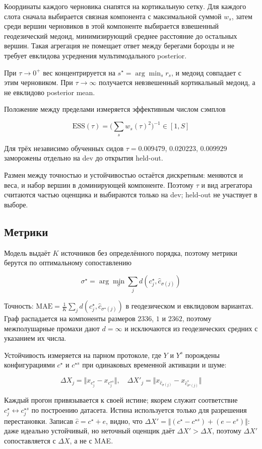 Координаты каждого черновика снапятся на кортикальную сетку. Для каждого слота сначала выбирается связная компонента с максимальной суммой $w_s$, затем среди вершин черновиков в этой компоненте выбирается взвешенный геодезический медоид, минимизирующий среднее расстояние до остальных вершин. Такая агрегация не помещает ответ между берегами борозды и не требует евклидова усреднения мультимодального posterior.

При $\tau \to 0^{+}$ вес концентрируется на $s^\star=\arg\min_s r_s$, и медоид совпадает с этим черновиком. При $\tau\to\infty$ получается невзвешенный кортикальный медоид, а не евклидово posterior mean.

Положение между пределами измеряется эффективным числом сэмплов

$$\mathrm{ESS}(\tau)=\Big(\sum_s w_s(\tau)^2\Big)^{-1} \in [1,S]$$

Для трёх независимо обученных сидов $\tau=0.009479$, $0.020223$, $0.009929$ заморожены отдельно на dev до открытия held-out.

Размен между точностью и устойчивостью остаётся дискретным: меняются и веса, и набор вершин в доминирующей компоненте. Поэтому $\tau$ и вид агрегатора считаются частью оценщика и выбираются только на dev; held-out не участвует в выборе.

\subsection{Метрики}

Модель выдаёт $K$ источников без определённого порядка, поэтому метрики берутся по оптимальному сопоставлению

$$\sigma^\star=\arg\min_{\sigma}\sum_{j} d(c^\star_j,\hat c_{\sigma(j)})$$

Точность: $\mathrm{MAE}=\frac1K\sum_j d(c^\star_j,\hat c_{\sigma^\star(j)})$ в геодезическом и евклидовом вариантах. Граф распадается на компоненты размеров $2336$, $1$ и $2362$, поэтому межполушарные промахи дают $d=\infty$ и исключаются из геодезических средних с указанием их числа.

Устойчивость измеряется на парном протоколе, где $Y$ и $Y^{s}$ порождены конфигурациями $c^\star$ и $c^{\star s}$ при одинаковых временной активации и шуме:

$$\Delta X_j=\Vert x_{c^\star_j}-x_{c^{\star s}_j}\Vert, \quad \Delta X'_j=\Vert x_{\hat c_{\sigma(j)}}-x_{\hat c^{s}_{\sigma^{s}(j)}}\Vert$$

Каждый прогон привязывается к своей истине; якорем служит соответствие $c^\star_j \leftrightarrow c^{\star s}_j$ по построению датасета. Истина используется только для разрешения перестановки. Записав $\hat c = c^\star + e$, видно, что $\Delta X' = \Vert (c^\star-c^{\star s})+(e-e^{s})\Vert$: даже идеально устойчивый, но неточный оценщик даёт $\Delta X' > \Delta X$, поэтому $\Delta X'$ сопоставляется с $\Delta X$, а не с MAE.

